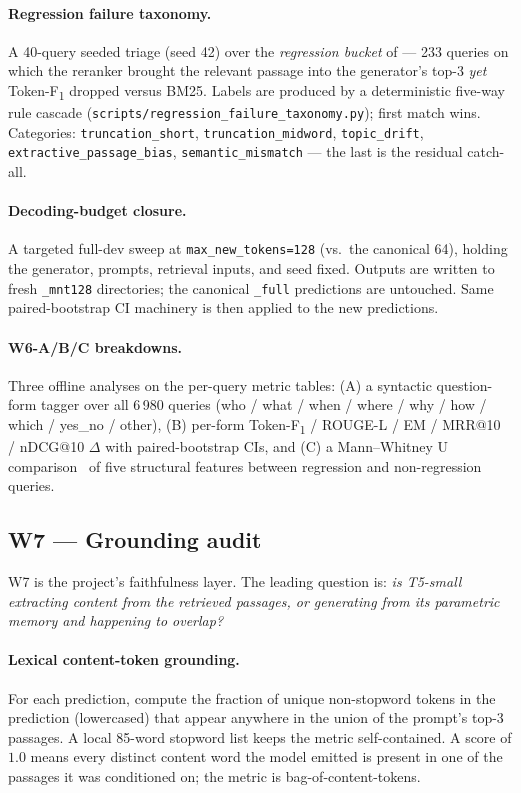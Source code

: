 \documentclass[11pt,a4paper]{article}
\makeatletter
\newcommand{\fdev}{6\,980}
\newcommand{\F}{F\textsubscript{1}}
\newcommand{\Tokenf}{Token-\F}
\newcommand{\rougel}{ROUGE-L}
\newcommand{\mrr}{MRR@10}
\newcommand{\ndcg}{nDCG@10}
\newcommand{\bmtwofive}{BM25}
\makeatother
\begin{document}
\paragraph{Regression failure taxonomy.}  A 40-query seeded triage
(seed 42) over the \emph{regression bucket} of 
--- 233 queries on which the reranker brought the relevant passage
into the generator's top-3 \emph{yet} \Tokenf{} dropped versus
\bmtwofive{}.  Labels are produced by a deterministic five-way rule
cascade (\texttt{scripts/regression\_failure\_taxonomy.py}); first
match wins.  Categories: \texttt{truncation\_short},
\texttt{truncation\_midword}, \texttt{topic\_drift},
\texttt{extractive\_passage\_bias}, \texttt{semantic\_mismatch} ---
the last is the residual catch-all.

\paragraph{Decoding-budget closure.}  A targeted full-dev sweep at
\texttt{max\_new\_tokens=128} (vs.\ the canonical 64), holding the
generator, prompts, retrieval inputs, and seed fixed.  Outputs are
written to fresh \texttt{\_mnt128} directories; the canonical
\texttt{\_full} predictions are untouched.  Same paired-bootstrap CI
machinery is then applied to the new predictions.

\paragraph{W6-A/B/C breakdowns.}  Three offline analyses on the
per-query metric tables: (A) a syntactic question-form tagger over
all \fdev{} queries (who / what / when / where / why / how / which
/ yes\_no / other), (B) per-form \Tokenf{} / \rougel{} / EM /
\mrr{} / \ndcg{} $\Delta$ with paired-bootstrap CIs, and (C) a
Mann--Whitney U comparison~\cite{mannwhitney1947} of five structural
features between regression and non-regression queries.

\subsection{W7 --- Grounding audit}
\label{sec:w7-method}

W7 is the project's faithfulness layer.  The leading question is:
\emph{is T5-small extracting content from the retrieved passages, or
generating from its parametric memory and happening to overlap?}

\paragraph{Lexical content-token grounding.}  For each prediction,
compute the fraction of unique non-stopword tokens in the prediction
(lowercased) that appear anywhere in the union of the prompt's
top-3 passages.  A local 85-word stopword list keeps the metric
self-contained.  A score of $1.0$ means every distinct content word
the model emitted is present in one of the passages it was
conditioned on; the metric is bag-of-content-tokens.
\end{document}

